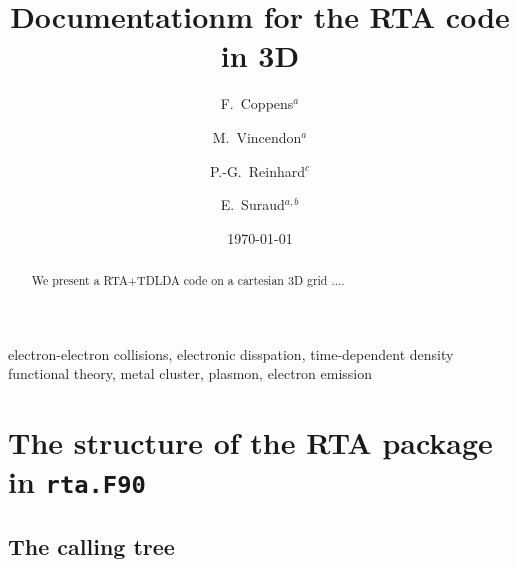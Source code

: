 \documentclass[final,1p]{elsarticle}
\begin{document}
\begin{frontmatter}

\title{Documentationm for the RTA code in 3D}

\author{F.~Coppens$^a$}
\author{M.~Vincendon$^a$}
\author{P.-G.~Reinhard$^c$}
\author{E.~Suraud$^{a,b}$}
\address{$^a$Universit\'e de Toulouse; UPS; Laboratoire de Physique
             Th\'{e}orique, IRSAMC; F-31062 Toulouse Cedex, France}
\address{$^b$Laboratoire de Physique Th\'eorique, Universit\'e Paul
  Sabatier, CNRS, F-31062 Toulouse C\'edex, France}
\address{$^c$Institut f{\"u}r Theoretische Physik, Universit{\"a}t
  Erlangen, D-91058 Erlangen, Germany}

\date{\today}
\begin{abstract}
We present a RTA+TDLDA code on a cartesian 3D grid ....
\end{abstract}

\begin{keyword}
electron-electron collisions, electronic disspation, time-dependent
density functional theory, metal cluster, plasmon, electron emission
\end{keyword}
\end{frontmatter}

\newpage


\section{The structure of the RTA package in {\tt rta.F90}}

\subsection{The calling tree}
\end{document}
